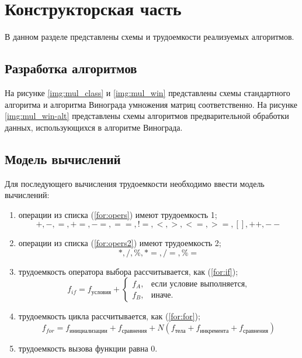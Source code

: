 \chapter{Конструкторская часть}

В данном разделе представлены схемы и трудоемкости реализуемых алгоритмов.

\section{Разработка алгоритмов}

На рисунке \ref{img:mul_class} и \ref{img:mul_win} представлены схемы стандартного алгоритма и алгоритма Винограда умножения матриц соответственно.
На рисунке \ref{img:mul_win-alt} представлены схемы алгоритмов предварительной обработки данных, использующихся в алгоритме Винограда.

\clearpage
{}
\clearpage
{}
\clearpage

\section{Модель вычислений}

Для последующего вычисления трудоемкости необходимо ввести модель вычислений:
\begin{enumerate}
    \item операции из списка (\ref{for:opers}) имеют трудоемкость 1;
        \begin{equation}
            \label{for:opers}
            +, -, =, +=, -=, ==, !=, <, >, <=, >=, [], ++, {-}-
        \end{equation}
    \item операции из списка (\ref{for:opers2}) имеют трудоемкость 2;
        \begin{equation}
            \label{for:opers2}
            *, /, \%, *=, /=, \%=
        \end{equation}
    \item трудоемкость оператора выбора  рассчитывается, как (\ref{for:if});
        \begin{equation}
            \label{for:if}
            f_{if} = f_{\text{условия}} +
            \begin{cases}
            f_A, & \text{если условие выполняется,}\\
            f_B, & \text{иначе.}
            \end{cases}
        \end{equation}
    \item трудоемкость цикла рассчитывается, как (\ref{for:for});
        \begin{equation}
            \label{for:for}
            f_{for} = f_{\text{инициализации}} + f_{\text{сравнения}} + N(f_{\text{тела}} + f_{\text{инкремента}} + f_{\text{сравнения}})
        \end{equation}
	\item трудоемкость вызова функции равна 0.
\end{enumerate}

